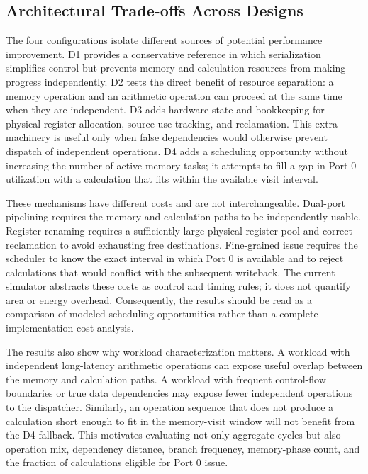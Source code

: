 \documentclass[conference]{IEEEtran}
\begin{document}
\subsection{Architectural Trade-offs Across Designs}
The four configurations isolate different sources of potential performance improvement. D1 provides a conservative reference in which serialization simplifies control but prevents memory and calculation resources from making progress independently. D2 tests the direct benefit of resource separation: a memory operation and an arithmetic operation can proceed at the same time when they are independent. D3 adds hardware state and bookkeeping for physical-register allocation, source-use tracking, and reclamation. This extra machinery is useful only when false dependencies would otherwise prevent dispatch of independent operations. D4 adds a scheduling opportunity without increasing the number of active memory tasks; it attempts to fill a gap in Port 0 utilization with a calculation that fits within the available visit interval.

These mechanisms have different costs and are not interchangeable. Dual-port pipelining requires the memory and calculation paths to be independently usable. Register renaming requires a sufficiently large physical-register pool and correct reclamation to avoid exhausting free destinations. Fine-grained issue requires the scheduler to know the exact interval in which Port 0 is available and to reject calculations that would conflict with the subsequent writeback. The current simulator abstracts these costs as control and timing rules; it does not quantify area or energy overhead. Consequently, the results should be read as a comparison of modeled scheduling opportunities rather than a complete implementation-cost analysis.

The results also show why workload characterization matters. A workload with independent long-latency arithmetic operations can expose useful overlap between the memory and calculation paths. A workload with frequent control-flow boundaries or true data dependencies may expose fewer independent operations to the dispatcher. Similarly, an operation sequence that does not produce a calculation short enough to fit in the memory-visit window will not benefit from the D4 fallback. This motivates evaluating not only aggregate cycles but also operation mix, dependency distance, branch frequency, memory-phase count, and the fraction of calculations eligible for Port 0 issue.
\end{document}
